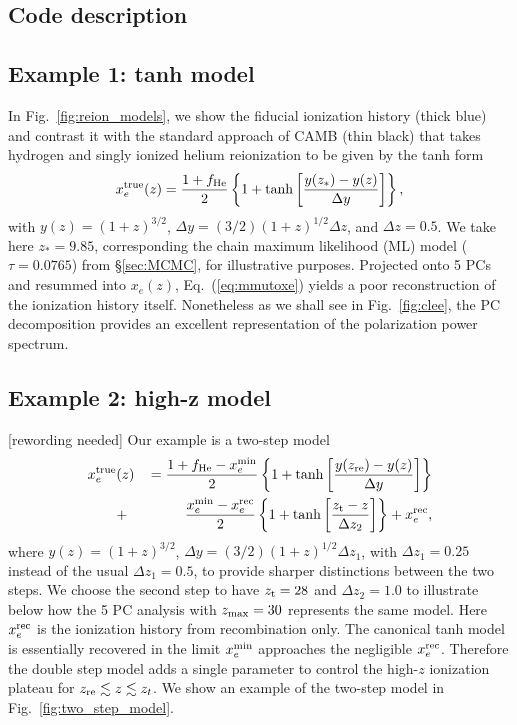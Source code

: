 \documentclass[prd,twocolumn,amsmath,amssymb,floatfix,superscriptaddress,nofootinbib]{revtex4-1}
\newcommand{\zmax}{z_{\rm max}}
\newcommand{\xemin}{x_e^{\rm min}}
\newcommand{\bea}{\begin{eqnarray}}
\newcommand{\eea}{\end{eqnarray}}
\begin{document}
\subsection{Code description}
\label{sec:code}

\subsection{Example 1: tanh model}
\label{sec:example1}

In Fig.~\ref{fig:reion_models}, we show the fiducial ionization history (thick blue) and contrast it with
the standard approach of CAMB (thin black) that takes hydrogen and singly ionized helium reionization to be given by
the tanh form
 \begin{equation}
x_e^{\rm true}(z) = \frac{1+f_{\rm He}}{2}\left\{  1+ \tanh\left[ \frac{y(z_*)-y(z)}{\Delta y} \right] \right\},
 \label{eqn:tanh}
 \end{equation}
 with $y(z)=(1+z)^{3/2}$, $\Delta y=(3/2)(1+z)^{1/2}\Delta z$, and $\Delta z = 0.5$.  We take here $z_*= 9.85$, corresponding the chain maximum likelihood (ML) model ($\tau = 0.0765$) from \S \ref{sec:MCMC},  for illustrative purposes.   Projected onto 5 PCs and resummed into $x_e(z)$, Eq.~(\ref{eq:mmutoxe}) yields a poor reconstruction of the ionization history itself.
 Nonetheless as we shall see in Fig.~\ref{fig:clee}, the PC decomposition provides an 
 excellent representation of the polarization power spectrum.
 

\subsection{Example 2: high-z model}
\label{sec:example2}
[rewording needed]
Our example is a two-step model 
 \bea
x_e^{\rm true}&(z)&\,= \frac{1+f_{\rm He} - \xemin}{2}\left\{  1+ \tanh\left[ \frac{y(z_{\rm re})-y(z)}{\Delta y} \right] \right\} \notag \\
&+& \frac{\xemin - x_e^{\rm rec}}{2}\left\{  1+ \tanh\left[ \frac{z_{\rm t}-z}{\Delta z_{2}} \right] \right\} + x_e^{\rm rec},
 \label{eqn:tanh_highz}
 \eea
where $y(z)=(1+z)^{3/2}$, $\Delta y=(3/2)(1+z)^{1/2}\Delta z_1$, with $\Delta z_1 = 0.25$ instead of the usual $\Delta z_1 = 0.5$,
to provide sharper distinctions between the two steps.
We choose the second step to have $z_{\rm t}=28$  and  $\Delta z_2 = 1.0$  to illustrate below
how the 5 PC analysis with $\zmax=30$ represents the same model.  Here $x_e^{\rm rec}$ is the ionization history from recombination only.
The canonical tanh model is essentially recovered in the limit $\xemin$ approaches the negligible $x_e^{\rm rec}$.  Therefore the double
step model adds a single parameter to control the high-$z$ ionization plateau for $z_{\rm re} \lesssim z \lesssim z_t$.   We show an example
of the two-step model in Fig.~\ref{fig:two_step_model}.
\end{document}
